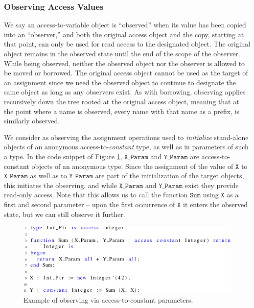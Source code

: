 \documentclass{llncs}
\newcommand\maroua[1]{\textcolor{red}{#1}}
\newcommand\var[1]{\ensuremath{\mathtt{#1}}}
\newcommand{\keyword}[1]{\textsf{#1}}
\begin{document}
\subsubsection{Observing Access Values}
\label{sec:observing}

We say an access-to-variable object is ``observed'' when its value has been copied into an ``observer,'' and both the original
access object and the copy, starting at that point, can only be used for read access to the designated object.
The original object remains in the observed state until the end of the scope of the observer. While being observed, neither the observed object nor the observer is allowed to be moved or
borrowed. The original access object cannot be used as the target of an assignment since we need the observed object to continue
to designate the same object as long as any observers exist.  As with borrowing, observing applies recursively down the tree rooted at the original access object, meaning that at the point where a name is observed,
every name with that name as a prefix, is similarly observed.


We consider as observing the assignment operations used to \textit{initialize} stand-alone objects of an anonymous access-to-\textit{constant} type, as well as \keyword{in} parameters of such a type.
In the code snippet of Figure \ref{fig:observe_exp}, \var{X\_Param} and \var{Y\_Param} are access-to-constant objects of an anonymous type. Since the assignment of the value of \var{X} to \var{X\_Param}
as well as to \var{Y\_Param} are part of the initialization of the target objects, this initiates the observing, and while \var{X\_Param} and \var{Y\_Param} exist they provide read-only access. Note that
this allows us to call the function \var{Sum} using \var{X} as a first and second parameter -- upon the first occurrence of \var{X} it enters the observed state, but we can still observe it further.

\begin{figure}[htb!]
\centering
   \includegraphics[]{observe_ex1}
   \caption{Example of observing via access-to-constant parameters.}
   \label{fig:observe_exp}
\end{figure}
\end{document}
